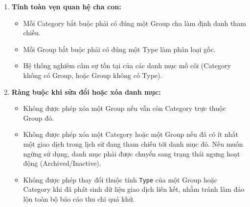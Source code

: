 \documentclass[11pt,a4paper]{article}
\providecommand{\tightlist}{
  \setlength{\itemsep}{0pt}\setlength{\parskip}{0pt}}
\begin{document}
\begin{enumerate}
\begin{itemize}
    \begin{itemize}
    \tightlist
    \item
      Với \texttt{Type\ =\ Income}: Các nhóm chuẩn gồm
      \texttt{employment} (Thu nhập từ tiền lương, việc làm),
      \texttt{assets} (Thu nhập từ tài sản, đầu tư, lãi suất),
      \texttt{other} (Các khoản thu nhập khác).
    \item
      Với \texttt{Type\ =\ Expense}: Các nhóm chuẩn gồm
      \texttt{essentials} (Chi tiêu thiết yếu cho đời sống),
      \texttt{personal\ \&\ leisure} (Chi tiêu cá nhân và hưởng thụ),
      \texttt{obligations\ \&\ transfers} (Nghĩa vụ phụng dưỡng, thuế
      phí), \texttt{savings\ \&\ investing} (Tích lũy và đầu tư).
    \end{itemize}
  \item
    Cấp 3: Danh mục chi tiết (Category). Là đơn vị phân loại nhỏ nhất,
    phản ánh cụ thể nội dung phát sinh giao dịch (ví dụ: tiền ăn uống,
    xăng xe, tiền điện nước, học phí), trực thuộc duy nhất một
    \texttt{Group}.
  \end{itemize}
\item
  \textbf{Tính toàn vẹn quan hệ cha con:}

  \begin{itemize}
  \tightlist
  \item
    Mỗi Category bắt buộc phải có đúng một Group cha làm định danh tham
    chiếu.
  \item
    Mỗi Group bắt buộc phải có đúng một Type làm phân loại gốc.
  \item
    Hệ thống nghiêm cấm sự tồn tại của các danh mục mồ côi (Category
    không có Group, hoặc Group không có Type).
  \end{itemize}
\item
  \textbf{Ràng buộc khi sửa đổi hoặc xóa danh mục:}

  \begin{itemize}
  \tightlist
  \item
    Không được phép xóa một Group nếu vẫn còn Category trực thuộc Group
    đó.
  \item
    Không được phép xóa một Category hoặc một Group nếu đã có ít nhất
    một giao dịch trong lịch sử đang tham chiếu tới danh mục đó. Nếu
    muốn ngừng sử dụng, danh mục phải được chuyển sang trạng thái ngưng
    hoạt động (Archived/Inactive).
  \item
    Không được phép thay đổi thuộc tính \texttt{Type} của một Group hoặc
    Category khi đã phát sinh dữ liệu giao dịch liên kết, nhằm tránh làm
    đảo lộn toàn bộ báo cáo thu chi quá khứ.
  \end{itemize}
\end{enumerate}
\end{document}
